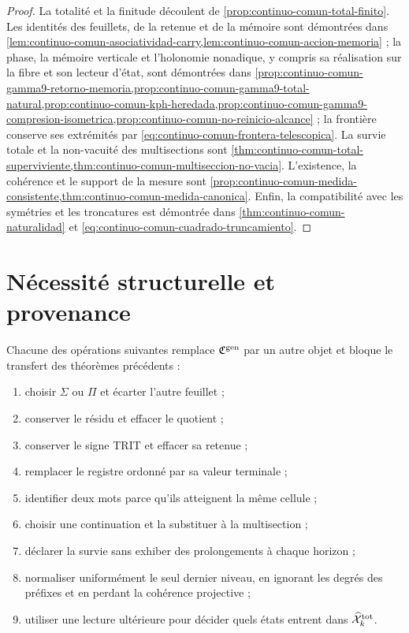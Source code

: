 \begin{proof}
La totalité et la finitude découlent de \cref{prop:continuo-comun-total-finito}. Les identités des feuillets, de la retenue et de la mémoire sont démontrées dans \cref{lem:continuo-comun-asociatividad-carry,lem:continuo-comun-accion-memoria} ; la phase, la mémoire verticale et l'holonomie nonadique, y compris sa réalisation sur la fibre et son lecteur d'état, sont démontrées dans \cref{prop:continuo-comun-gamma9-retorno-memoria,prop:continuo-comun-gamma9-total-natural,prop:continuo-comun-kph-heredada,prop:continuo-comun-gamma9-compresion-isometrica,prop:continuo-comun-no-reinicio-alcance} ; la frontière conserve ses extrémités par \eqref{eq:continuo-comun-frontera-telescopica}. La survie totale et la non-vacuité des multisections sont \cref{thm:continuo-comun-total-superviviente,thm:continuo-comun-multiseccion-no-vacia}. L'existence, la cohérence et le support de la mesure sont \cref{prop:continuo-comun-medida-consistente,thm:continuo-comun-medida-canonica}. Enfin, la compatibilité avec les symétries et les troncatures est démontrée dans \cref{thm:continuo-comun-naturalidad} et \eqref{eq:continuo-comun-cuadrado-truncamiento}.
\end{proof}

\section{Nécessité structurelle et provenance}
\label{sec:continuo-comun-falsadores}

\begin{proposition}
\label{prop:continuo-comun-falsadores}
Chacune des opérations suivantes remplace \(\mathfrak C^{\rm gen}\) par un autre objet et bloque le transfert des théorèmes précédents :
\begin{enumerate}
 \item choisir \(\Sigma\) ou \(\Pi\) et écarter l'autre feuillet ;
 \item conserver le résidu et effacer le quotient ;
 \item conserver le signe TRIT et effacer sa retenue ;
 \item remplacer le registre ordonné par sa valeur terminale ;
 \item identifier deux mots parce qu'ils atteignent la même cellule ;
 \item choisir une continuation et la substituer à la multisection ;
 \item déclarer la survie sans exhiber des prolongements à chaque horizon ;
 \item normaliser uniformément le seul dernier niveau, en ignorant les degrés des préfixes et en perdant la cohérence projective ;
 \item utiliser une lecture ultérieure pour décider quels états entrent dans \(\widehat{\mathcal X}^{\rm tot}_k\).
\end{enumerate}
\end{proposition}

